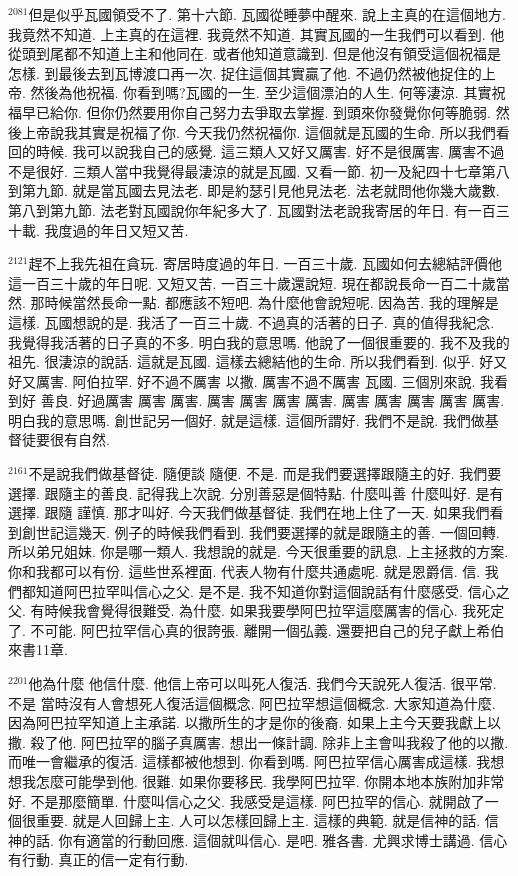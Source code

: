 \documentclass{book}
\begin{document}
$^{2081}$但是似乎瓦國領受不了.
第十六節.
瓦國從睡夢中醒來.
說上主真的在這個地方.
我竟然不知道.
上主真的在這裡.
我竟然不知道.
其實瓦國的一生我們可以看到.
他從頭到尾都不知道上主和他同在.
或者他知道意識到.
但是他沒有領受這個祝福是怎樣.
到最後去到瓦博渡口再一次.
捉住這個其實贏了他.
不過仍然被他捉住的上帝.
然後為他祝福.
你看到嗎?瓦國的一生.
至少這個漂泊的人生.
何等淒涼.
其實祝福早已給你.
但你仍然要用你自己努力去爭取去掌握.
到頭來你發覺你何等脆弱.
然後上帝說我其實是祝福了你.
今天我仍然祝福你.
這個就是瓦國的生命.
所以我們看回的時候.
我可以說我自己的感覺.
這三類人又好又厲害.
好不是很厲害.
厲害不過不是很好.
三類人當中我覺得最淒涼的就是瓦國.
又看一節.
初一及紀四十七章第八到第九節.
就是當瓦國去見法老.
即是約瑟引見他見法老.
法老就問他你幾大歲數.
第八到第九節.
法老對瓦國說你年紀多大了.
瓦國對法老說我寄居的年日.
有一百三十載.
我度過的年日又短又苦.

$^{2121}$趕不上我先祖在貪玩.
寄居時度過的年日.
一百三十歲.
瓦國如何去總結評價他這一百三十歲的年日呢.
又短又苦.
一百三十歲還說短.
現在都說長命一百二十歲當然.
那時候當然長命一點.
都應該不短吧.
為什麼他會說短呢.
因為苦.
我的理解是這樣.
瓦國想說的是.
我活了一百三十歲.
不過真的活著的日子.
真的值得我紀念.
我覺得我活著的日子真的不多.
明白我的意思嗎.
他說了一個很重要的.
我不及我的祖先.
很淒涼的說話.
這就是瓦國.
這樣去總結他的生命.
所以我們看到.
似乎.
好又好又厲害.
阿伯拉罕.
好不過不厲害 以撒.
厲害不過不厲害 瓦國.
三個別來說.
我看到好 善良.
好過厲害 厲害 厲害.
厲害 厲害 厲害 厲害.
厲害 厲害 厲害 厲害 厲害.
明白我的意思嗎.
創世記另一個好.
就是這樣.
這個所謂好.
我們不是說.
我們做基督徒要很有自然.

$^{2161}$不是說我們做基督徒.
隨便談 隨便.
不是.
而是我們要選擇跟隨主的好.
我們要選擇.
跟隨主的善良.
記得我上次說.
分別善惡是個特點.
什麼叫善 什麼叫好.
是有選擇.
跟隨 謹慎.
那才叫好.
今天我們做基督徒.
我們在地上住了一天.
如果我們看到創世記這幾天.
例子的時候我們看到.
我們要選擇的就是跟隨主的善.
一個回轉.
所以弟兄姐妹.
你是哪一類人.
我想說的就是.
今天很重要的訊息.
上主拯救的方案.
你和我都可以有份.
這些世系裡面.
代表人物有什麼共通處呢.
就是恩爵信.
信.
我們都知道阿巴拉罕叫信心之父.
是不是.
我不知道你對這個說話有什麼感受.
信心之父.
有時候我會覺得很難受.
為什麼.
如果我要學阿巴拉罕這麼厲害的信心.
我死定了.
不可能.
阿巴拉罕信心真的很誇張.
離開一個弘義.
還要把自己的兒子獻上希伯來書11章.

$^{2201}$他為什麼 他信什麼.
他信上帝可以叫死人復活.
我們今天說死人復活.
很平常.
不是 當時沒有人會想死人復活這個概念.
阿巴拉罕想這個概念.
大家知道為什麼.
因為阿巴拉罕知道上主承諾.
以撒所生的才是你的後裔.
如果上主今天要我獻上以撒.
殺了他.
阿巴拉罕的腦子真厲害.
想出一條計調.
除非上主會叫我殺了他的以撒.
而唯一會繼承的復活.
這樣都被他想到.
你看到嗎.
阿巴拉罕信心厲害成這樣.
我想想我怎麼可能學到他.
很難.
如果你要移民.
我學阿巴拉罕.
你開本地本族附加非常好.
不是那麼簡單.
什麼叫信心之父.
我感受是這樣.
阿巴拉罕的信心.
就開啟了一個很重要.
就是人回歸上主.
人可以怎樣回歸上主.
這樣的典範.
就是信神的話.
信神的話.
你有適當的行動回應.
這個就叫信心.
是吧.
雅各書.
尤興求博士講過.
信心有行動.
真正的信一定有行動.
\end{document}
